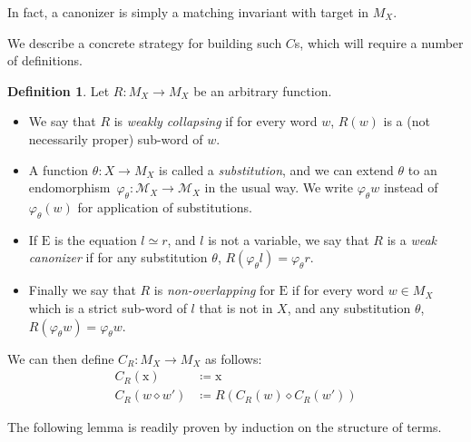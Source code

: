 \documentclass[12pt]{amsart}
\theoremstyle{definition}
\newtheorem{definition}[theorem]{Definition}
\newcommand{\x}{\mathrm{x}}
\newcommand{\op}{\diamond}
\newcommand{\Magma}{{\mathcal{M}}}
\newcommand{\E}{\mathrm{E}}
\begin{document}
In fact, a canonizer is simply a matching invariant with target in $M_X$.

We describe a concrete strategy for building such $C$s, which will require a number of definitions.


\begin{definition}\label{def:canon}
Let $R \colon M_X \to M_X$ be an arbitrary function.
\setlength{\parskip}{0pt}
\begin{itemize}
\item  We say that $R$ is \emph{weakly collapsing} if for every word $w$, $R(w)$ is a (not necessarily proper) sub-word of $w$.
\item  A function $\theta\colon X\rightarrow M_X$ is called a \emph{substitution}, and we can extend $\theta$ to an endomorphism~$\varphi_\theta \colon \Magma_X\rightarrow\Magma_X$ in the usual way. We write $\varphi_\theta w$ instead of $\varphi_\theta(w)$ for application of substitutions.
\item  If $\E$ is the equation $l\simeq r$, and $l$ is not a variable, we say that $R$ is a \emph{weak canonizer} if for any substitution $\theta$, $R(\varphi_\theta l)=\varphi_\theta r$.
\item  Finally we say that $R$ is \emph{non-overlapping} for $\E$ if for every word $w\in M_X$ which is a strict sub-word of $l$ that is not in $X$, and any substitution $\theta$, $R(\varphi_\theta w) = \varphi_\theta w$.
\end{itemize}
  We can then define $C_R\colon M_X\rightarrow M_X$ as follows:
\begin{align}
  C_R(\x) &\coloneqq \x\\
  C_R(w\op w') &\coloneqq R(C_R(w)\op C_R(w'))
\end{align}
\end{definition}

The following lemma is readily proven by induction on the structure of terms.
\end{document}
